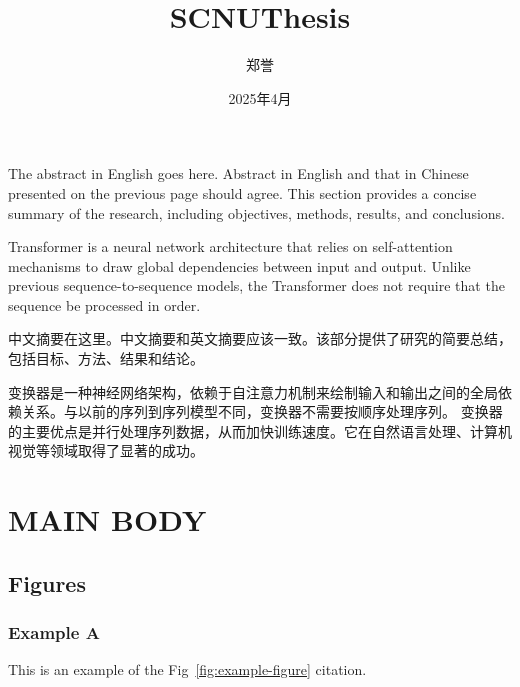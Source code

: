 \documentclass{scnuthesis}
\title{SCNUThesis}
\author{郑誉}
\date{2025年4月}
\begin{document}
    \maketitle

    \begin{abstracten}
        The abstract in English goes here. Abstract in English and that in
        Chinese presented on the previous page should agree. This section provides
        a concise summary of the research, including objectives, methods,
        results, and conclusions.

        Transformer is a neural network architecture that relies on self-attention
        mechanisms to draw global dependencies between input and output. Unlike
        previous sequence-to-sequence models, the Transformer does not require that
        the sequence be processed in order.
    \end{abstracten}

    \begin{abstractzh}
        中文摘要在这里。中文摘要和英文摘要应该一致。该部分提供了研究的简要总结，包括目标、方法、结果和结论。

        变换器是一种神经网络架构，依赖于自注意力机制来绘制输入和输出之间的全局依赖关系。与以前的序列到序列模型不同，变换器不需要按顺序处理序列。
        变换器的主要优点是并行处理序列数据，从而加快训练速度。它在自然语言处理、计算机视觉等领域取得了显著的成功。
    \end{abstractzh}

    \toc

    \chapter{MAIN BODY}

    \section{Figures}
    \subsection{Example A}
    This is an example of the Fig~\ref{fig:example-figure} citation.
\end{document}
